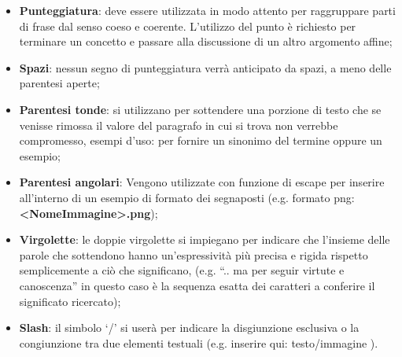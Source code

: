 				\begin{itemize}
					\item\textbf{Punteggiatura}: deve essere utilizzata in modo attento per raggruppare parti di frase dal senso coeso e coerente. L’utilizzo del punto è richiesto per terminare un concetto e passare alla discussione di un altro argomento affine;
					\item\textbf{Spazi}: nessun segno di punteggiatura verrà anticipato da spazi, a meno delle parentesi aperte;
					\item\textbf{Parentesi tonde}: si utilizzano per sottendere una porzione di testo che se venisse rimossa il valore del paragrafo in cui si trova non verrebbe compromesso, esempi d’uso: per fornire un sinonimo del termine oppure un esempio;
					\item\textbf{Parentesi angolari}: Vengono utilizzate con funzione di escape per inserire all’interno di un esempio di formato dei segnaposti (e.g. formato png: \textbf{<NomeImmagine>.png});
					\item\textbf{Virgolette}: le doppie virgolette si impiegano per indicare che l’insieme delle parole che sottendono hanno un’espressività più precisa e rigida rispetto semplicemente a ciò che significano, (e.g. “.. ma per seguir virtute e canoscenza” in questo caso è la sequenza esatta dei caratteri a conferire il significato ricercato);
					\item\textbf{Slash}: il simbolo ‘/’ si userà per indicare la disgiunzione esclusiva o la congiunzione tra due elementi testuali (e.g. inserire qui: testo/immagine ).
				\end{itemize}

